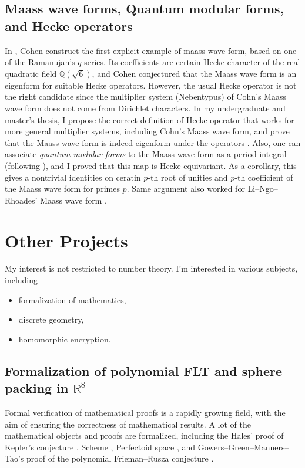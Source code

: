 \documentclass[12pt]{article}
\begin{document}
\subsection*{Maass wave forms, Quantum modular forms, and Hecke operators}

In \cite{cohen1988q}, Cohen construct the first explicit example of maass wave form, based on one of the Ramanujan's $q$-series.
Its coefficients are certain Hecke character of the real quadratic field $\mathbb{Q}(\sqrt{6})$, and Cohen conjectured that the Maass wave form is an eigenform for suitable Hecke operators.
However, the usual Hecke operator is not the right candidate since the multiplier system (Nebentypus) of Cohn's Maass wave form does not come from Dirichlet characters.
In my undergraduate and master's thesis, I propose the correct definition of Hecke operator that works for more general multiplier systems, including Cohn's Maass wave form, and prove that the Maass wave form is indeed eigenform under the operators \cite{lee2018quantum,lee2019maass}.
Also, one can associate \emph{quantum modular forms} to the Maass wave form as a period integral (following \cite{lewis2001period,zagier2010quantum}), and I proved that this map is Hecke-equivariant.
As a corollary, this gives a nontrivial identities on ceratin $p$-th root of unities and $p$-th coefficient of the Maass wave form for primes $p$.
Same argument also worked for Li--Ngo--Rhoades' Maass wave form \cite{li2013renormalization}.


\section*{Other Projects}

My interest is not restricted to number theory. I'm interested in various subjects, including
\begin{itemize}
    \item formalization of mathematics,
    \item discrete geometry,
    \item homomorphic encryption.
\end{itemize}




\subsection*{Formalization of polynomial FLT and sphere packing in $\mathbb{R}^{8}$}

Formal verification of mathematical proofs is a rapidly growing field, with the aim of ensuring the correctness of mathematical results.
A lot of the mathematical objects and proofs are formalized, including the Hales' proof of Kepler's conjecture \cite{hales2017formal}, Scheme \cite{buzzard2022schemes}, Perfectoid space \cite{buzzard2020formalising}, and Gowers--Green--Manners--Tao's proof of the polynomial Frieman--Rusza conjecture \cite{gowers2023conjecture,pfr}.
\end{document}
